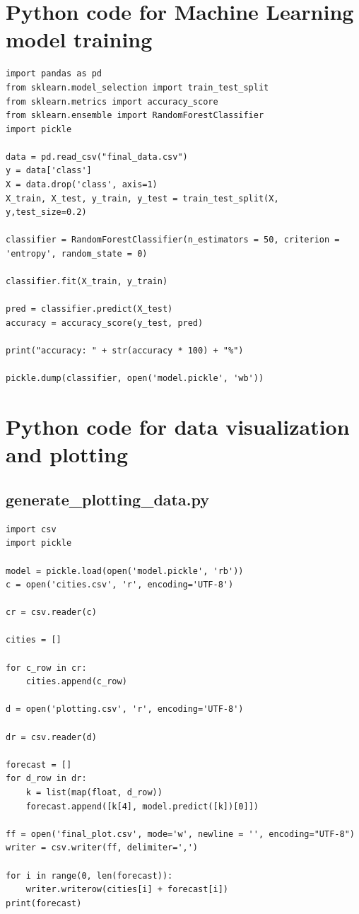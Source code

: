 \documentclass[a4paper,12pt]{report}
\begin{document}
\section{Python code for Machine Learning model training}

\begin{lstlisting}
import pandas as pd
from sklearn.model_selection import train_test_split
from sklearn.metrics import accuracy_score
from sklearn.ensemble import RandomForestClassifier
import pickle

data = pd.read_csv("final_data.csv")
y = data['class']
X = data.drop('class', axis=1)
X_train, X_test, y_train, y_test = train_test_split(X, y,test_size=0.2)

classifier = RandomForestClassifier(n_estimators = 50, criterion = 'entropy', random_state = 0)

classifier.fit(X_train, y_train)

pred = classifier.predict(X_test)
accuracy = accuracy_score(y_test, pred)

print("accuracy: " + str(accuracy * 100) + "%")

pickle.dump(classifier, open('model.pickle', 'wb'))   
\end{lstlisting}

\section{Python code for data visualization and plotting}

\subsection{generate\_plotting\_data.py}

\begin{lstlisting}
import csv
import pickle

model = pickle.load(open('model.pickle', 'rb'))
c = open('cities.csv', 'r', encoding='UTF-8')

cr = csv.reader(c)

cities = []

for c_row in cr:
    cities.append(c_row) 

d = open('plotting.csv', 'r', encoding='UTF-8')

dr = csv.reader(d)

forecast = []
for d_row in dr:
    k = list(map(float, d_row))
    forecast.append([k[4], model.predict([k])[0]])

ff = open('final_plot.csv', mode='w', newline = '', encoding="UTF-8")
writer = csv.writer(ff, delimiter=',')

for i in range(0, len(forecast)):
    writer.writerow(cities[i] + forecast[i])
print(forecast)    
\end{lstlisting}
\end{document}
